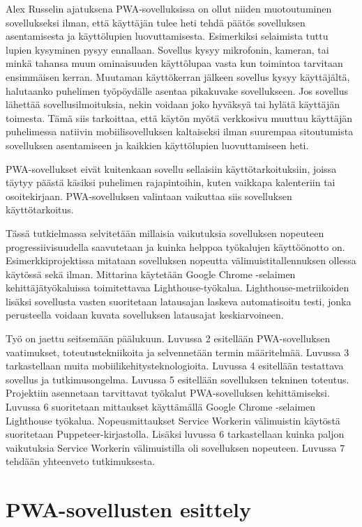 \documentclass{tktltiki}
\begin{document}
Alex  Russelin ajatuksena \cite{Russell} PWA-sovelluksissa on ollut niiden muotoutuminen sovellukseksi ilman, että käyttäjän tulee heti tehdä päätös sovelluksen asentamisesta ja käyttölupien luovuttamisesta. Esimerkiksi selaimista tuttu lupien kysyminen pysyy ennallaan. Sovellus kysyy mikrofonin, kameran, tai minkä tahansa muun ominaisuuden käyttölupaa vasta kun toimintoa tarvitaan ensimmäisen kerran. Muutaman käyttökerran jälkeen sovellus kysyy käyttäjältä, halutaanko puhelimen työpöydälle asentaa pikakuvake sovellukseen. Jos sovellus lähettää sovellusilmoituksia, nekin voidaan joko hyväksyä tai hylätä käyttäjän toimesta. Tämä siis tarkoittaa, että käytön myötä verkkosivu muuttuu käyttäjän puhelimessa natiivin mobiilisovelluksen kaltaiseksi ilman suurempaa sitoutumista sovelluksen asentamiseen ja kaikkien käyttölupien luovuttamiseen heti. 

PWA-sovellukset eivät kuitenkaan sovellu sellaisiin käyttötarkoituksiin, joissa täytyy päästä käsiksi puhelimen rajapintoihin, kuten vaikkapa kalenteriin tai osoitekirjaan. PWA-sovelluksen valintaan vaikuttaa siis sovelluksen käyttötarkoitus. 

Tässä tutkielmassa selvitetään millaisia vaikutuksia sovelluksen nopeuteen progressiivisuudella saavutetaan ja kuinka helppoa työkalujen käyttöönotto on. Esimerkkiprojektissa mitataan sovelluksen nopeutta välimuistitallennuksen ollessa käytössä sekä ilman. Mittarina käytetään Google Chrome -selaimen kehittäjätyökaluissa toimitettavaa Lighthouse-työkalua. Lighthouse-metriikoiden lisäksi sovellusta vasten suoritetaan latausajan laskeva automatisoitu testi, jonka perusteella voidaan kuvata sovelluksen latausajat keskiarvoineen. 

Työ on jaettu seitsemään päälukuun. Luvussa 2 esitellään PWA-sovelluksen vaatimukset, toteutustekniikoita ja selvennetään termin määritelmää. Luvussa 3 tarkastellaan muita mobiilikehitysteknologioita. Luvussa 4 esitellään testattava sovellus ja tutkimusongelma. Luvussa 5 esitellään sovelluksen tekninen toteutus. Projektiin asennetaan tarvittavat työkalut PWA-sovelluksen kehittämiseksi. Luvussa 6 suoritetaan mittaukset käyttämällä Google Chrome -selaimen Lighthouse työkalua. Nopeusmittaukset Service Workerin välimuistin käytöstä suoritetaan Puppeteer-kirjastolla. Lisäksi luvussa 6 tarkastellaan kuinka paljon vaikutuksia Service Workerin välimuistilla oli sovelluksen nopeuteen. Luvussa 7 tehdään yhteenveto tutkimuksesta.

\newpage
\section{PWA-sovellusten esittely}
\end{document}
